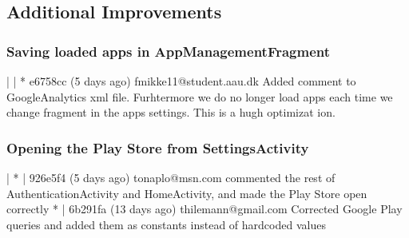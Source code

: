 \subsection{Additional Improvements}

\subsubsection{Saving loaded apps in AppManagementFragment}
| | * e6758cc (5 days ago) fmikke11@student.aau.dk Added comment to GoogleAnalytics xml file. Furhtermore we do no longer load apps each time we change fragment in the apps settings. This is a hugh optimizat
ion.

\subsubsection{Opening the Play Store from SettingsActivity}
| * | 926e5f4 (5 days ago) tonaplo@msn.com commented the rest of AuthenticationActivity and HomeActivity, and made the Play Store open correctly
* | 6b291fa (13 days ago) thilemann@gmail.com Corrected Google Play queries and added them as constants instead of hardcoded values